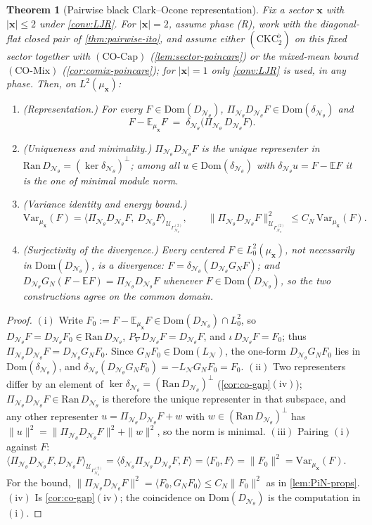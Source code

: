 \documentclass[reqno,final,11pt]{amsart}
\theoremstyle{plain}
\newtheorem{theorem}{Theorem}[section]
\theoremstyle{definition}
\theoremstyle{remark}
\newcommand{\E}{\mathbb E}
\newcommand{\Dom}{\mathrm{Dom}}
\newcommand{\cN}{\mathcal N}
\newcommand{\cU}{\mathcal U}
\newcommand{\GamN}{\Gamma^{(2)}_{\cN_\theta}}
\newcommand{\DN}{D_{\cN_\theta}}
\newcommand{\divN}{\delta_{\cN_\theta}}
\newcommand{\PiN}{\Pi_{\cN_\theta}}
\newcommand{\COcap}{(\mathrm{CO\text{-}Cap})}
\newcommand{\COmix}{(\mathrm{CO\text{-}Mix})}
\newcommand{\Ltwoz}{L^2_0}
\begin{document}
\begin{theorem}[Pairwise black Clark--Ocone representation]\label{thm:clarkocone}
Fix a sector $\mathbf x$ with $|\mathbf x|\le2$ under \cref{conv:LJR}. For
$|\mathbf x|=2$, assume phase \textnormal{(R)}, work with the diagonal-flat
closed pair of \cref{thm:pairwise-ito}, and assume either
$(\mathrm{CKC}_2^{\flat})$ on this fixed sector together with $\COcap$
(\cref{lem:sector-poincare}) or the mixed-mean bound $\COmix$
(\cref{cor:comix-poincare}); for $|\mathbf x|=1$ only \cref{conv:LJR}
is used, in any phase. Then, on $L^2(\mu_{\mathbf x})$:
\begin{enumerate}
\item[$(\mathrm i)$] (Representation.) For every $F\in\Dom(\DN)$,
$\PiN\DN F\in\Dom(\divN)$ and
\[
  F-\E_{\mu_{\mathbf x}}F\;=\;\divN\bigl(\PiN\,\DN F\bigr).
\]
\item[$(\mathrm{ii})$] (Uniqueness and minimality.) $\PiN\DN F$ is the
unique representer in $\mathrm{Ran}\,\DN=(\ker\divN)^{\perp}$; among all
$u\in\Dom(\divN)$ with $\divN u=F-\E F$ it is the one of minimal module norm.
\item[$(\mathrm{iii})$] (Variance identity and energy bound.)
\[
  \mathrm{Var}_{\mu_{\mathbf x}}(F)
  =\bigl\langle\PiN\DN F,\ \DN F\bigr\rangle_{\cU_{\GamN}},
  \qquad
  \|\PiN\DN F\|^2_{\cU_{\GamN}}\le C_N\,\mathrm{Var}_{\mu_{\mathbf x}}(F).
\]
\item[$(\mathrm{iv})$] (Surjectivity of the divergence.) Every centered
$F\in\Ltwoz(\mu_{\mathbf x})$, not necessarily in $\Dom(\DN)$, is a divergence:
$F=\divN(\DN G_NF)$; and $\DN G_N(F-\E F)=\PiN\DN F$ whenever $F\in\Dom(\DN)$,
so the two constructions agree on the common domain.
\end{enumerate}
\end{theorem}
\begin{proof}
$(\mathrm i)$ Write $F_0:=F-\E_{\mu_{\mathbf x}}F\in\Dom(\DN)\cap\Ltwoz$, so
$\DN F=\DN F_0\in\mathrm{Ran}\,\DN$, $P_\nabla\DN F=\DN F$, and
$\iota\,\DN F=F_0$; thus $\PiN\DN F=\DN G_NF_0$. Since
$G_NF_0\in\Dom(L_{\cN})$, the one-form $\DN G_NF_0$ lies in $\Dom(\divN)$, and
$\divN(\DN G_NF_0)=-L_{\cN}G_NF_0=F_0$.
$(\mathrm{ii})$ Two representers differ by an element of
$\ker\divN=(\mathrm{Ran}\,\DN)^{\perp}$ (\cref{cor:co-gap}$(\mathrm{iv})$);
$\PiN\DN F\in\mathrm{Ran}\,\DN$ is therefore the unique representer in that
subspace, and any other representer $u=\PiN\DN F+w$ with
$w\in(\mathrm{Ran}\,\DN)^{\perp}$ has
$\|u\|^2=\|\PiN\DN F\|^2+\|w\|^2$, so the norm is minimal.
$(\mathrm{iii})$ Pairing $(\mathrm i)$ against $F$:
$\langle\PiN\DN F,\DN F\rangle_{\cU_{\GamN}}
=\langle\divN\PiN\DN F,F\rangle=\langle F_0,F\rangle=\|F_0\|^2
=\mathrm{Var}_{\mu_{\mathbf x}}(F)$. For the bound,
$\|\PiN\DN F\|^2=\langle F_0,G_NF_0\rangle\le C_N\|F_0\|^2$ as in
\cref{lem:PiN-props}.
$(\mathrm{iv})$ Is \cref{cor:co-gap}$(\mathrm{iv})$; the coincidence on
$\Dom(\DN)$ is the computation in $(\mathrm i)$.
\end{proof}
\end{document}

